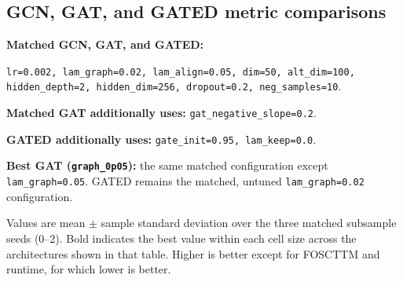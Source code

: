 \documentclass[10pt]{article}
\begin{document}
\begin{landscape}
\section*{GCN, GAT, and GATED metric comparisons}
\noindent\textbf{Matched GCN, GAT, and GATED:}\par\noindent \texttt{lr=0.002, lam\_graph=0.02, lam\_align=0.05, dim=50, alt\_dim=100, hidden\_depth=2, hidden\_dim=256, dropout=0.2, neg\_samples=10}.
\par\smallskip
\noindent\textbf{Matched GAT additionally uses:} \texttt{gat\_negative\_slope=0.2}.
\par\smallskip
\noindent\textbf{GATED additionally uses:} \texttt{gate\_init=0.95, lam\_keep=0.0}.
\par\smallskip
\noindent\textbf{Best GAT (\texttt{graph\_0p05}):} the same matched configuration except \texttt{lam\_graph=0.05}. GATED remains the matched, untuned \texttt{lam\_graph=0.02} configuration.
\par\smallskip
\noindent Values are mean $\pm$ sample standard deviation over the three matched subsample seeds (0--2). Bold indicates the best value within each cell size across the architectures shown in that table. Higher is better except for FOSCTTM and runtime, for which lower is better.
\vspace{8pt}

\end{landscape}
\end{document}
